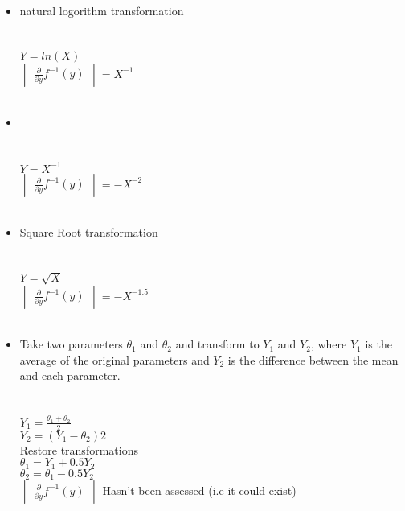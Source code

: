 \begin{itemize}
\item {} natural logorithm transformation\\
\\
\\
$Y = ln(X)$\\
$\begin{vmatrix} \frac{\partial}{\partial y} f^{-1}(y) \end{vmatrix} = X^{-1}$\\\\

\item {}\\
\\
\\
$Y = X^{-1}$\\
$\begin{vmatrix} \frac{\partial}{\partial y} f^{-1}(y) \end{vmatrix} = -X^{-2}$\\\\

\item {} Square Root transformation\\
\\
\\
$Y = \sqrt{X}$\\
$\begin{vmatrix} \frac{\partial}{\partial y} f^{-1}(y) \end{vmatrix} = -X^{-1.5}$\\\\

\item {} Take two parameters $\theta_1$ and $\theta_2$ and transform to $Y_1$ and $Y_2$, where $Y_1$ is the average of the original parameters and $Y_2$ is the difference between the mean and each parameter.\\
\\
\\
$Y_1 = \frac{\theta_1 + \theta_2}{2}$\\
$Y_2 =  (Y_1 - \theta_2)2 $\\
Restore transformations\\
$\theta_1 = Y_1 + 0.5Y_2$\\
$\theta_2 = \theta_1 - 0.5Y_2$\\
$\begin{vmatrix} \frac{\partial}{\partial y} f^{-1}(y) \end{vmatrix}$ Hasn't been assessed (i.e it could exist)\\\\


\end{itemize}
